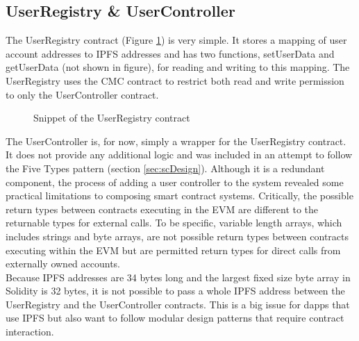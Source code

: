 \subsection{UserRegistry \& UserController}
The UserRegistry contract (Figure \ref{fig:UserRegistry}) is very simple. It stores a mapping of user account addresses to IPFS addresses and has two functions, setUserData and getUserData (not shown in figure), for reading and writing to this mapping. The UserRegistry uses the CMC contract to restrict both read and write permission to only the UserController contract. \\

\begin{figure}
\centering
{}
\decoRule
\caption[UserRegistry Contract Snippet]{Snippet of the UserRegistry contract}
\label{fig:UserRegistry}
\end{figure}

The UserController is, for now, simply a wrapper for the UserRegistry contract. It does not provide any additional logic and was included in an attempt to follow the Five Types pattern (section \ref{sec:scDesign}). Although it is a redundant component, the process of adding a user controller to the system revealed some practical limitations to composing smart contract systems. Critically, the possible return types between contracts executing in the EVM are different to the returnable types for external calls. To be specific, variable length arrays, which includes strings and byte arrays, are not possible return types between contracts executing within the EVM but are permitted return types for direct calls from externally owned accounts. \\

Because IPFS addresses are 34 bytes long and the largest fixed size byte array in Solidity is 32 bytes, it is not possible to pass a whole IPFS address between the UserRegistry and the UserController contracts. This is a big issue for dapps that use IPFS but also want to follow modular design patterns that require contract interaction. \\

